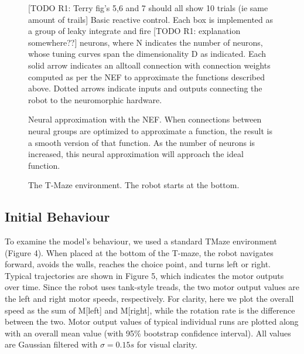 \documentclass[conference]{IEEEtran}
\begin{document}
\begin{figure}[!t]
\centering
\caption{[TODO R1: Terry fig's 5,6 and 7 should all show 10 trials (ie same amount of trails] Basic reactive control. Each box is implemented as a group of leaky integrate and fire [TODO R1: explanation somewhere??] neurons, where N indicates the number of neurons, whose tuning curves span the dimensionality D as indicated. Each solid arrow indicates an alltoall connection with connection weights computed as per the NEF to approximate the functions described above. Dotted arrows indicate inputs
and outputs connecting the robot to the neuromorphic hardware.}
\label{React}
\end{figure}

\begin{figure}[!t]
\centering
\caption{Neural approximation with the NEF. When connections between neural groups are optimized to approximate a function, the result is a smooth version of that function. As the number of neurons is increased, this neural approximation will approach the ideal function.}
\label{NEF}
\end{figure}


\begin{figure}[!t]
\centering
\caption{The T-Maze environment. The robot starts at the bottom.}
\label{Tmaze}
\end{figure}

\subsection{Initial Behaviour}

To examine the model's behaviour, we used a standard TMaze
environment (Figure 4). When placed at the bottom
of the T-maze, the robot navigates forward, avoids the
walls, reaches the choice point, and turns left or right.
Typical trajectories are shown in Figure 5, which indicates
the motor outputs over time. Since the robot uses tank-style
treads, the two motor output values are the left and right
motor speeds, respectively. For clarity, here we plot the
overall speed as the sum of M[left] and M[right], while
the rotation rate is the difference between the two. Motor output values of typical individual runs are plotted along
with an overall mean value (with 95\% bootstrap confidence
interval). All values are Gaussian filtered with $\sigma=0.15s$ for visual clarity.
\end{document}
